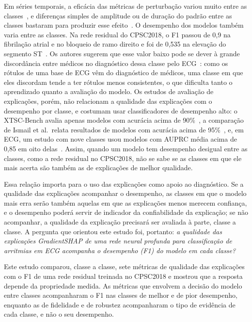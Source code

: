 Em séries temporais, a eficácia das métricas de perturbação variou muito entre as classes~\cite{baer2025a}, e diferenças simples de amplitude ou de duração do padrão entre as classes bastaram para produzir esse efeito~\cite{baer2025b}. O desempenho dos modelos também varia entre as classes. Na rede residual do CPSC2018, o F1 passou de 0,9 na fibrilação atrial e no bloqueio de ramo direito e foi de 0,535 na elevação do segmento ST~\cite{zhang2021}. Os autores sugerem que esse valor baixo pode se dever à grande discordância entre médicos no diagnóstico dessa classe pelo ECG~\cite{zhang2021}: como os rótulos de uma base de ECG vêm do diagnóstico de médicos, uma classe em que eles discordam tende a ter rótulos menos consistentes, o que dificulta tanto o aprendizado quanto a avaliação do modelo. Os estudos de avaliação de explicações, porém, não relacionam a qualidade das explicações com o desempenho por classe, e costumam usar classificadores de desempenho alto: o XTSC-Bench avalia apenas modelos com acurácia acima de 90\%~\cite{hollig2023}, a comparação de Ismail et al.\ relata resultados de modelos com acurácia acima de 95\%~\cite{ismail2020}, e, em ECG, um estudo com nove classes usou modelos com AUPRC média acima de 0,85 em oito delas~\cite{arends2026}. Assim, quando um modelo tem desempenho desigual entre as classes, como a rede residual no CPSC2018, não se sabe se as classes em que ele mais acerta são também as de explicações de melhor qualidade.

Essa relação importa para o uso das explicações como apoio ao diagnóstico. Se a qualidade das explicações acompanhar o desempenho, as classes em que o modelo mais erra serão também aquelas em que as explicações menos merecem confiança, e o desempenho poderá servir de indicador da confiabilidade da explicação; se não acompanhar, a qualidade da explicação precisará ser avaliada à parte, classe a classe. A pergunta que orientou este estudo foi, portanto: \emph{a qualidade das explicações GradientSHAP de uma rede neural profunda para classificação de arritmias em ECG acompanha o desempenho (F1) do modelo em cada classe?}

Este estudo comparou, classe a classe, sete métricas de qualidade das explicações com o F1 de uma rede residual treinada no CPSC2018 e mostrou que a resposta depende da propriedade medida. As métricas que envolvem a decisão do modelo entre classes acompanharam o F1 nas classes de melhor e de pior desempenho, enquanto as de fidelidade e de robustez acompanharam o tipo de evidência de cada classe, e não o seu desempenho.
